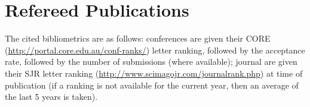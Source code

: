\documentclass[10pt,a4paper,sans]{moderncv}
\newif\ifmetrics
\begin{document}




\newpage
\section{Refereed Publications}


\ifmetrics
The cited bibliometrics are as follows: conferences are given their CORE (\url{http://portal.core.edu.au/conf-ranks/}) letter ranking, followed by the acceptance rate, followed by the number of submissions (where available); journal are given their SJR letter ranking (\url{http://www.scimagojr.com/journalrank.php}) at time of publication (if a ranking is not available for the current year, then an average of the last 5 years is taken).




\end{document}
